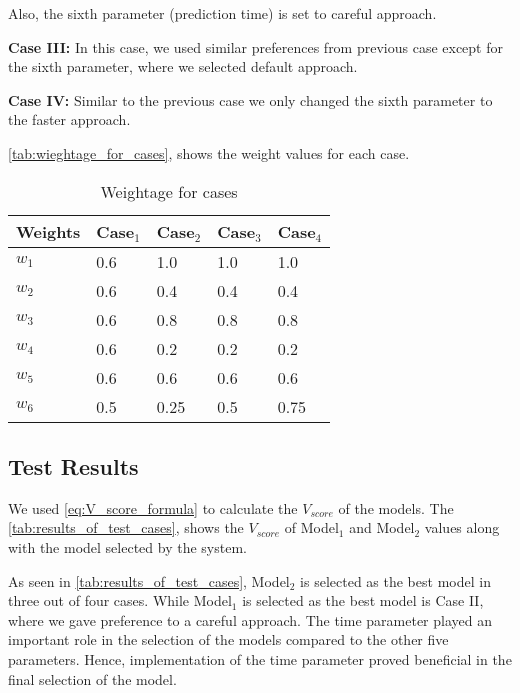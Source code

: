 \noindent
Also, the sixth parameter (prediction time) is set to careful approach.

\vspace*{0.5em}
\noindent
{\bfseries Case III:} In this case, we used similar preferences from previous case except for the sixth parameter, where we selected default approach.

\vspace*{0.5em}
\noindent
{\bfseries Case IV:} Similar to the previous case we only changed the sixth parameter to the faster approach.

\vspace*{0.5em}
\autoref{tab:wieghtage_for_cases}, shows the weight values for each case.

\begin{table}[ht]
    \caption{Weightage for cases}\label{tab:wieghtage_for_cases}
    \begin{tabular*}{\tblwidth}{@{}LLLLL@{}}
        \toprule
        Weights & Case$_1$ & Case$_2$ & Case$_3$ & Case$_4$ \\
        \midrule
        $w_1$ & 0.6 & 1.0 & 1.0 & 1.0 \\
        $w_2$ & 0.6 & 0.4 & 0.4 & 0.4 \\
        $w_3$ & 0.6 & 0.8 & 0.8 & 0.8 \\
        $w_4$ & 0.6 & 0.2 & 0.2 & 0.2 \\
        $w_5$ & 0.6 & 0.6 & 0.6 & 0.6 \\
        $w_6$ & 0.5 & 0.25 & 0.5 & 0.75 \\
        \bottomrule
    \end{tabular*}
\end{table}


\subsection{Test Results}\label{subsec:results_and_discussion}
We used \autoref{eq:V_score_formula} to calculate the $V_{score}$ of the models. The \autoref{tab:results_of_test_cases}, shows the $V_{score}$ of Model$_1$ and Model$_2$ values along with the model selected by the system.

As seen in \autoref{tab:results_of_test_cases}, Model$_2$ is selected as the best model in three out of four cases. While Model$_1$ is selected as the best model is Case II, where we gave preference to a careful approach. The time parameter played an important role in the selection of the models compared to the other five parameters. Hence, implementation of the time parameter proved beneficial in the final selection of the model.

